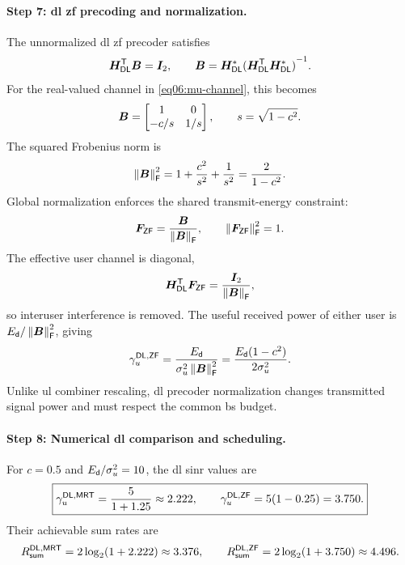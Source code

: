 \paragraph{Step 7: \ac{dl} \ac{zf} precoding and normalization.}
The unnormalized \ac{dl} \ac{zf} precoder satisfies
\begin{equation*}
	{\bm{H}}^{\mathsf{T}}_{\mathsf{DL}}\bm{B}=\bm{I}_2,
	\qquad
	\bm{B}={\bm{H}}^{*}_{\mathsf{DL}}
	{({\bm{H}}^{\mathsf{T}}_{\mathsf{DL}}{\bm{H}}^{*}_{\mathsf{DL}})}^{-1}.
\end{equation*}
For the real-valued channel in \eqref{eq06:mu-channel}, this becomes
\begin{equation*}
	\bm{B}=\begin{bmatrix}1&0\\-c/s&1/s\end{bmatrix},
	\qquad s=\sqrt{1-c^2}.
\end{equation*}
The squared Frobenius norm is
\begin{equation*}
	\left\|\bm{B}\right\|_{\mathsf{F}}^2
	=1+\frac{c^2}{s^2}+\frac1{s^2}
	=\frac{2}{1-c^2}.
\end{equation*}
Global normalization enforces the shared transmit-energy constraint:
\begin{equation*}
	\bm{F}_{\mathsf{ZF}}=\frac{\bm{B}}{\left\|\bm{B}\right\|_{\mathsf{F}}},
	\qquad
	\left\|\bm{F}_{\mathsf{ZF}}\right\|_{\mathsf{F}}^2=1.
\end{equation*}
The effective user channel is diagonal,
\begin{equation*}
	{\bm{H}}^{\mathsf{T}}_{\mathsf{DL}}\bm{F}_{\mathsf{ZF}}
	=\frac{\bm{I}_2}{\left\|\bm{B}\right\|_{\mathsf{F}}},
\end{equation*}
so interuser interference is removed. The useful received power of either user is $E_{\mathsf{d}}/\left\|\bm{B}\right\|_{\mathsf{F}}^2$, giving
\begin{equation}
	\gamma_u^{\mathsf{DL},\mathsf{ZF}}
	=\frac{E_{\mathsf{d}}}{\sigma_u^2\left\|\bm{B}\right\|_{\mathsf{F}}^2}
	=\frac{E_{\mathsf{d}}(1-c^2)}{2\sigma_u^2}.
	\label{eq06:dl-zf}
\end{equation}
Unlike \ac{ul} combiner rescaling, \ac{dl} precoder normalization changes transmitted signal power and must respect the common \ac{bs} budget.

\paragraph{Step 8: Numerical \ac{dl} comparison and scheduling.}
For $c=0.5$ and $E_{\mathsf{d}}/\sigma_u^2=10$, the \ac{dl} \ac{sinr} values are
\begin{equation}
	\boxed{
		\gamma_u^{\mathsf{DL},\mathsf{MRT}}=\frac{5}{1+1.25}\approx2.222,
		\qquad
		\gamma_u^{\mathsf{DL},\mathsf{ZF}}=5(1-0.25)=3.750.
	}
	\label{eq06:dl-two}
\end{equation}
Their achievable sum rates are
\begin{equation*}
	R_{\mathsf{sum}}^{\mathsf{DL},\mathsf{MRT}}
	=2\log_2(1+2.222)\approx3.376,
	\qquad
	R_{\mathsf{sum}}^{\mathsf{DL},\mathsf{ZF}}
	=2\log_2(1+3.750)\approx4.496.
\end{equation*}

